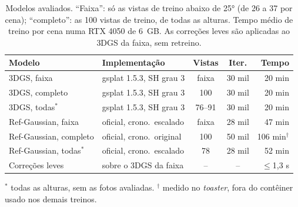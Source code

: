 \begin{table}[t]
\centering
\caption{Modelos avaliados. ``Faixa'': só as vistas de treino abaixo de 25° (de 26 a 37 por cena); ``completo'': as 100 vistas de treino, de todas as alturas. Tempo médio de treino por cena numa RTX 4050 de 6~GB. As correções leves são aplicadas ao 3DGS da faixa, sem retreino.}
\label{tab:modelos}
\setlength{\tabcolsep}{2.5pt}
\footnotesize
\begin{tabular}{l l c c r}
\toprule
Modelo & Implementação & Vistas & Iter. & Tempo \\
\midrule
3DGS, faixa & gsplat 1.5.3, SH grau 3 & faixa & 30 mil & 20 min \\
3DGS, completo & gsplat 1.5.3, SH grau 3 & 100 & 30 mil & 20 min \\
3DGS, todas$^\ast$ & gsplat 1.5.3, SH grau 3 & 76--91 & 30 mil & 20 min \\
Ref-Gaussian, faixa & oficial, crono.\ escalado & faixa & 28 mil & 47 min \\
Ref-Gaussian, completo & oficial, crono.\ original & 100 & 50 mil & 106 min$^\dagger$ \\
Ref-Gaussian, todas$^\ast$ & oficial, crono.\ escalado & 78 & 28 mil & 52 min \\
Correções leves & sobre o 3DGS da faixa & -- & -- & $\le$1,3 s \\
\bottomrule
\end{tabular}

\vspace{2pt}
{\scriptsize $^\ast$ todas as alturas, sem as fotos avaliadas. $^\dagger$ medido no \textit{toaster}, fora do contêiner usado nos demais treinos.}
\end{table}
